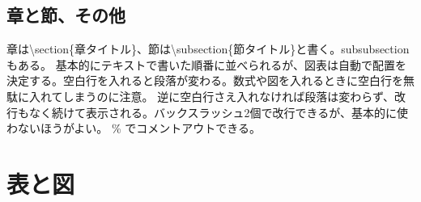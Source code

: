 \documentclass[uplatex,dvipdfmx,a4j,9pt,twocolumn,twoside]{jsarticle}
\begin{document}
\subsection{章と節、その他}

章は\textbackslash section\{章タイトル\}、節は\textbackslash subsection\{節タイトル\}と書く。subsubsectionもある。
基本的にテキストで書いた順番に並べられるが、図表は自動で配置を決定する。空白行を入れると段落が変わる。数式や図を入れるときに空白行を無駄に入れてしまうのに注意。
逆に空白行さえ入れなければ段落は変わらず、改行もなく続けて表示される。バックスラッシュ2個で改行できるが、基本的に使わないほうがよい。
\% でコメントアウトできる。

\section{表と図}
\end{document}
